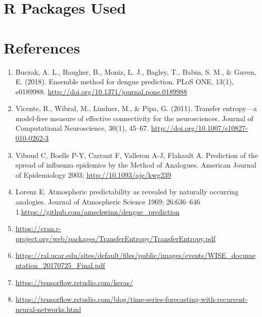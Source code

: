 \documentclass[floatsintext,man]{apa6}
\providecommand{\tightlist}{%
  \setlength{\itemsep}{0pt}\setlength{\parskip}{0pt}}
\theoremstyle{definition}
\theoremstyle{definition}
\theoremstyle{definition}
\theoremstyle{remark}
\begin{document}
\newpage

\section{R Packages Used}\label{r-packages-used}

\newpage

\section{References}\label{references}

\begin{enumerate}
\def\labelenumi{\arabic{enumi}.}
\tightlist
\item
  Buczak, A. L., Baugher, B., Moniz, L. J., Bagley, T., Babin, S. M., \&
  Guven, E. (2018). Ensemble method for dengue prediction. PLoS ONE,
  13(1), e0189988. \url{http://doi.org/10.1371/journal.pone.0189988}
\item
  Vicente, R., Wibral, M., Lindner, M., \& Pipa, G. (2011). Transfer
  entropy---a model-free measure of effective connectivity for the
  neurosciences. Journal of Computational Neuroscience, 30(1), 45--67.
  \url{http://doi.org/10.1007/s10827-010-0262-3}
\item
  Viboud C, Boelle P-Y, Carrant F, Valleron A-J, Flahault A. Prediction
  of the spread of influenza epidemics by the Method of Analogues.
  American Journal of Epidemiology 2003; \url{http://10.1093/aje/kwg239}
\item
  Lorenz E. Atmospheric predictability as revealed by naturally
  occurring analogies. Journal of Atmospheric Science 1969; 26:636--646
  1.\url{https://github.com/amschwinn/dengue_prediction}
\item
  \url{https://cran.r-project.org/web/packages/TransferEntropy/TransferEntropy.pdf}
\item
  \url{https://ral.ucar.edu/sites/default/files/public/images/events/WISE_documentation_20170725_Final.pdf}
\item
  \url{https://tensorflow.rstudio.com/keras/}
\item
  \url{https://tensorflow.rstudio.com/blog/time-series-forecasting-with-recurrent-neural-networks.html}
\end{enumerate}

\begingroup
\setlength{\parindent}{-0.5in} \setlength{\leftskip}{0.5in}

\hypertarget{refs}{}

\endgroup
\end{document}

